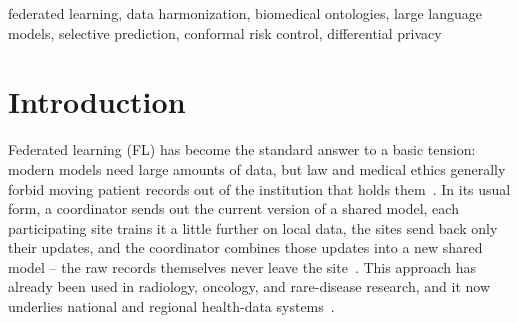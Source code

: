 \documentclass[conference]{IEEEtran}
\begin{document}
\begin{abstract}
regardless of any of this: registry coverage grows monotonically across every simulated round on both tasks, and the differential-privacy noise added to registry disclosures shrinks in a stable, decreasing way as the privacy budget loosens. Together these results say the architecture's safety comes specifically from M4's refusal to act on an unreliable signal, not from M1--M3 improving accuracy on their own, and that raw LLM confidence is not yet a usable calibration signal by itself -- it needs to be combined with the structural agreement M2 already computes, which this pilot did not yet test. FedHarm keeps the two-step approach's flexible, ontology-agnostic character, while moving the work inside the trust boundary and adding the ability to express and control uncertainty that real clinical deployment demands.
\end{abstract}

\begin{IEEEkeywords}
federated learning, data harmonization, biomedical ontologies, large language models, selective prediction, conformal risk control, differential privacy
\end{IEEEkeywords}

\section{Introduction}

Federated learning (FL) has become the standard answer to a basic tension: modern models need large amounts of data, but law and medical ethics generally forbid moving patient records out of the institution that holds them~\cite{b2,b3,b4,b5}. In its usual form, a coordinator sends out the current version of a shared model, each participating site trains it a little further on local data, the sites send back only their updates, and the coordinator combines those updates into a new shared model -- the raw records themselves never leave the site~\cite{b3}. This approach has already been used in radiology, oncology, and rare-disease research, and it now underlies national and regional health-data systems~\cite{b5,b6}.
\end{document}

